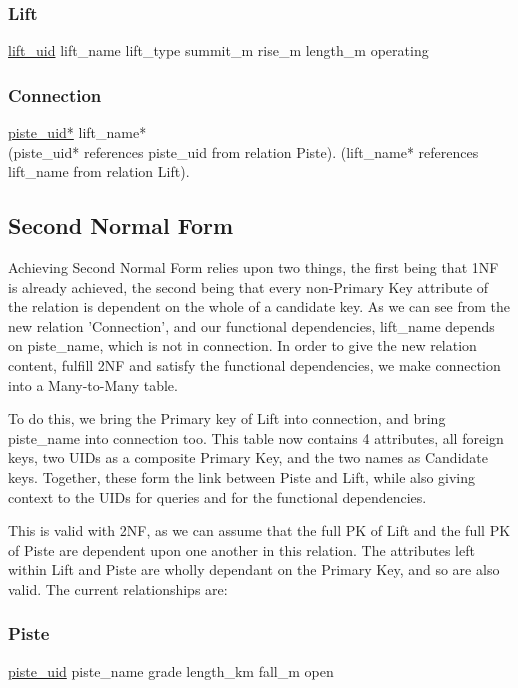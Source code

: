 \documentclass[11pt]{scrartcl} %
\begin{document}
\subsubsection{Lift}
\underline{lift\_uid}\newline
lift\_name\newline
lift\_type\newline
summit\_m\newline
rise\_m\newline
length\_m\newline
operating

\subsubsection{Connection}
\underline{piste\_uid*}\newline
lift\_name*\\[0.3cm]
(piste\_uid* references piste\_uid from relation Piste).
(lift\_name* references lift\_name from relation Lift).

\subsection{Second Normal Form}
Achieving Second Normal Form relies upon two things, the first being that 1NF is already achieved, the second being that every non-Primary Key attribute of the relation is dependent on the whole of a candidate key. As we can see from the new relation 'Connection', and our functional dependencies, lift\_name depends on piste\_name, which is not in connection. In order to give the new relation content, fulfill 2NF and satisfy the functional dependencies, we make connection into a Many-to-Many table.

To do this, we bring the Primary key of Lift into connection, and bring piste\_name into connection too. This table now contains 4 attributes, all foreign keys, two UIDs as a composite Primary Key, and the two names as Candidate keys. Together, these form the link between Piste and Lift, while also giving context to the UIDs for queries and for the functional dependencies.

This is valid with 2NF, as we can assume that the full PK of Lift and the full PK of Piste are dependent upon one another in this relation. The attributes left within Lift and Piste are wholly dependant on the Primary Key, and so are also valid. The current relationships are:

\subsubsection{Piste}
\underline{piste\_uid}\newline
piste\_name\newline
grade\newline
length\_km\newline
fall\_m\newline
open
\end{document}
